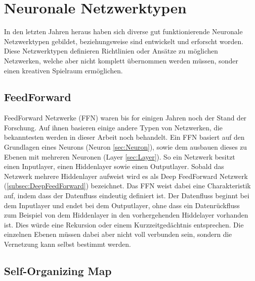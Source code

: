 
\section{Neuronale Netzwerktypen}

In den letzten Jahren heraus haben sich diverse gut funktionierende Neuronale Netzwerktypen gebildet,  beziehungsweise sind entwickelt und erforscht worden. 
Diese Netzwerktypen definieren Richtlinien oder Ansätze zu möglichen Netzwerken, welche aber nicht komplett übernommen werden müssen, sonder einen kreativen Spielraum ermöglichen. \\


\subsection{FeedForward}
\label{subsec:FeedForward}

FeedForward Netzwerke (FFN) waren bis for einigen Jahren noch der Stand der Forschung.
Auf ihnen basieren einige andere Typen von Netzwerken, die bekanntesten werden in dieser Arbeit noch behandelt.
Ein FFN basiert auf den Grundlagen eines Neurons (Neuron \ref{sec:Neuron}), sowie dem ausbauen dieses zu Ebenen mit mehreren Neuronen (Layer \ref{sec:Layer}).
So ein Netzwerk besitzt einen Inputlayer, einen Hiddenlayer sowie einen Outputlayer.
Sobald das Netzwerk mehrere Hiddenlayer aufweist wird es als Deep FeedForward Netzwerk (\ref{subsec:DeepFeedForward}) bezeichnet.
Das FFN weist dabei eine Charakteristik auf, indem dass der Datenfluss eindeutig definiert ist. 
Der Datenfluss beginnt bei dem Inputlayer und endet bei dem Outputlayer, ohne dass ein Datenrückfluss zum Beispiel von dem Hiddenlayer in den vorhergehenden Hiddelayer vorhanden ist.
Dies würde eine Rekursion oder einem Kurzzeitgedächtnis entsprechen.
Die einzelnen Ebenen müssen dabei aber nicht voll verbunden sein, sondern die Vernetzung kann selbst bestimmt werden.

\subsection{Self-Organizing Map}
\label{subsec:SelfOrganizingMap}


